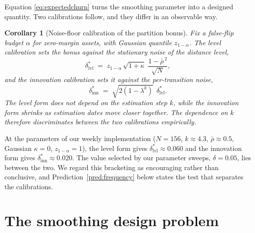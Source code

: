 \documentclass[11pt]{article}
\newtheorem{corollary}{Corollary}
\theoremstyle{remark}
\begin{document}
Equation \eqref{eq:expectedchurn} turns the smoothing parameter into a designed
quantity. Two calibrations follow, and they differ in an observable way.

\begin{corollary}[Noise-floor calibration of the partition bonus]
\label{cor:delta}
Fix a false-flip budget $\alpha$ for zero-margin assets, with Gaussian quantile
$z_{1-\alpha}$. The level calibration sets the bonus against the stationary
noise of the distance level,
\begin{equation}
\delta^{*}_{\mathrm{lvl}}
\;=\; z_{1-\alpha}\, \sqrt{1+\kappa}\; \frac{1-\bar{\rho}^{\,2}}{\sqrt{N}},
\label{eq:deltalevel}
\end{equation}
and the innovation calibration sets it against the per-transition noise,
\begin{equation}
\delta^{*}_{\mathrm{inn}}
\;=\; \sqrt{2\left(1-\lambda^{k}\right)}\;\, \delta^{*}_{\mathrm{lvl}}.
\label{eq:deltainnovation}
\end{equation}
The level form does not depend on the estimation step $k$, while the
innovation form shrinks as estimation dates move closer together. The
dependence on $k$ therefore discriminates between the two calibrations
empirically.
\end{corollary}

At the parameters of our weekly implementation ($N=156$, $k \approx 4.3$,
$\bar{\rho} \approx 0.5$, Gaussian $\kappa = 0$, $z_{1-\alpha} = 1$), the level
form gives $\delta^{*}_{\mathrm{lvl}} \approx 0.060$ and the innovation form
gives $\delta^{*}_{\mathrm{inn}} \approx 0.020$. The value selected by our
parameter sweeps, $\delta = 0.05$, lies between the two. We regard this
bracketing as encouraging rather than conclusive, and
Prediction~\ref{pred:frequency} below states the test that separates the
calibrations.

\section{The smoothing design problem}
\end{document}
